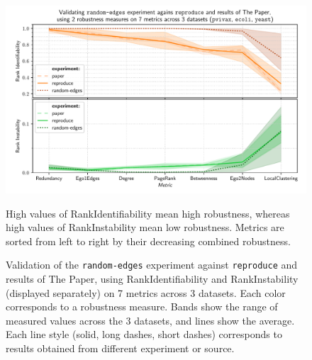 \begin{figure}
    \includegraphics[width=\linewidth]{plot_random_edges.pdf}
    \vspace*{-0.6cm}
    \caption{Validation of the \texttt{random-edges} experiment against \texttt{reproduce} and results of The Paper, using RankIdentifiability and RankInstability (displayed separately) on 7 metrics across 3 datasets.
    Each color corresponds to a robustness measure.
    Bands show the range of measured values across the 3 datasets, and lines show the average.
    Each line style (solid, long dashes, short dashes) corresponds to results obtained from different experiment or source.}
    \label{fig:plot_random_edges}
    \footnotesize
    \begin{flushleft}
        High values of RankIdentifiability mean high robustness, whereas high values of RankInstability mean low robustness.
        Metrics are sorted from left to right by their decreasing combined robustness.
    \end{flushleft}
\end{figure}
